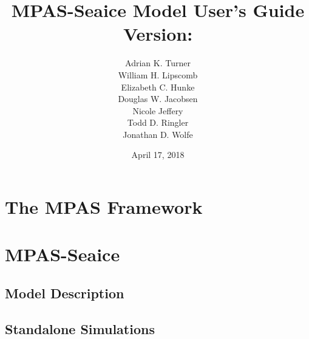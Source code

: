 \documentclass[11pt]{report}
\newcommand\BackgroundPic{%
	\put(0,0){%
		\parbox[b][\paperheight]{\paperwidth}{%
			\centering
			\texttt{[image: ocean/figures/MPAS\_LOGO\_Ocean.png]}%
			\vfill
			\texttt{[image: ocean/figures/cover\_V3\_KE\_NA37-7km\_cropped\_d.png]}%
}}}
\begin{document}

\title{
\Huge MPAS-Seaice Model User's Guide \\
\LARGE Version: \version
}




\author{
\begin{tabular}{c}
Adrian K. Turner \tabularnewline
William H. Lipscomb \tabularnewline
Elizabeth C. Hunke \tabularnewline
Douglas W. Jacobsen \tabularnewline
Nicole Jeffery \tabularnewline
Todd D. Ringler \tabularnewline
Jonathan D. Wolfe
\end{tabular}
}

\date{April 17, 2018}

\maketitle

%


\tableofcontents

\part{The MPAS Framework}





\part{MPAS-Seaice}

\chapter{Model Description}
\label{chap:model_description}








\chapter{Standalone Simulations}
\label{chap:standalone_simulations}
\end{document}
